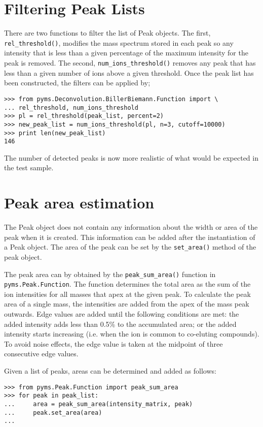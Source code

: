 \section{Filtering Peak Lists}


There are two functions to filter the list of Peak objects. The first, {\tt
rel\_threshold()}, modifies the mass spectrum stored in each peak so any
intensity that is less than a given percentage of the maximum intensity for the
peak is removed. The second, {\tt num\_ions\_threshold()} removes any peak that
has less than a given number of ions above a given threshold. Once the peak
list has been constructed, the filters can be applied by;

\begin{verbatim}
>>> from pyms.Deconvolution.BillerBiemann.Function import \
... rel_threshold, num_ions_threshold
>>> pl = rel_threshold(peak_list, percent=2)
>>> new_peak_list = num_ions_threshold(pl, n=3, cutoff=10000)
>>> print len(new_peak_list)
146
\end{verbatim}

The number of detected peaks is now more realistic of what would be expected in
the test sample.

\section{Peak area estimation}


The Peak object does not contain any information about the width or area of the
peak when it is created. This information can be added after the instantiation
of a Peak object. The area of the peak can be set by the {\tt set\_area()}
method of the peak object.

The peak area can by obtained by the {\tt peak\_sum\_area()} function in {\tt
pyms.Peak.Function}. The function determines the total
area as the sum of the ion intensities for all masses that apex at the given
peak. To calculate the peak area of a single mass, the intensities are added
from the apex of the mass peak outwards. Edge values are added until the
following conditions are met: the added intensity adds less than 0.5\% to the
accumulated area; or the added intensity starts increasing (i.e. when the ion is
common to co-eluting compounds). To avoid noise effects, the edge value is taken
at the midpoint of three consecutive edge values.

Given a list of peaks, areas can be determined and added as follows:
\begin{verbatim}
>>> from pyms.Peak.Function import peak_sum_area
>>> for peak in peak_list:
...     area = peak_sum_area(intensity_matrix, peak)
...     peak.set_area(area)
...
\end{verbatim}
